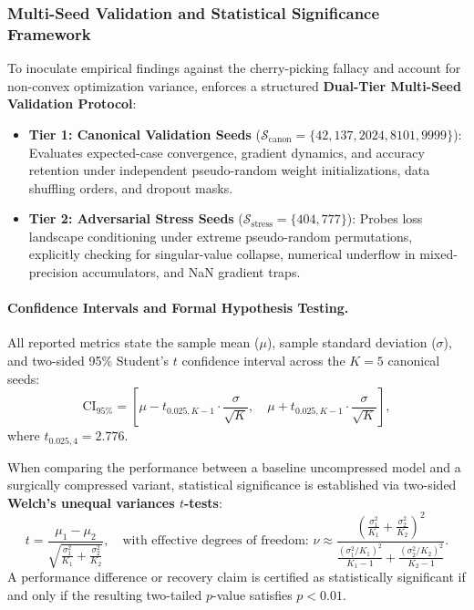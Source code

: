 \subsubsection{Multi-Seed Validation and Statistical Significance Framework}
To inoculate empirical findings against the cherry-picking fallacy and account for non-convex optimization variance, \neuralops{} enforces a structured \textbf{Dual-Tier Multi-Seed Validation Protocol}:
\begin{itemize}
    \item \textbf{Tier 1: Canonical Validation Seeds} ($\mathcal{S}_{\text{canon}} = \{42, 137, 2024, 8101, 9999\}$): Evaluates expected-case convergence, gradient dynamics, and accuracy retention under independent pseudo-random weight initializations, data shuffling orders, and dropout masks.
    \item \textbf{Tier 2: Adversarial Stress Seeds} ($\mathcal{S}_{\text{stress}} = \{404, 777\}$): Probes loss landscape conditioning under extreme pseudo-random permutations, explicitly checking for singular-value collapse, numerical underflow in mixed-precision accumulators, and NaN gradient traps.
\end{itemize}

\paragraph{Confidence Intervals and Formal Hypothesis Testing.}
All reported metrics state the sample mean ($\mu$), sample standard deviation ($\sigma$), and two-sided 95\% Student's $t$ confidence interval across the $K=5$ canonical seeds:
\begin{equation}
\label{eq:confidence_interval}
\text{CI}_{95\%} = \left[ \mu - t_{0.025, K-1} \cdot \frac{\sigma}{\sqrt{K}}, \quad \mu + t_{0.025, K-1} \cdot \frac{\sigma}{\sqrt{K}} \right],
\end{equation}
where $t_{0.025, 4} = 2.776$.

When comparing the performance between a baseline uncompressed model and a surgically compressed variant, statistical significance is established via two-sided \textbf{Welch's unequal variances $t$-tests}:
\begin{equation}
\label{eq:welch_t_test}
t = \frac{\mu_1 - \mu_2}{\sqrt{\frac{\sigma_1^2}{K_1} + \frac{\sigma_2^2}{K_2}}}, \quad \text{with effective degrees of freedom: } \nu \approx \frac{\left( \frac{\sigma_1^2}{K_1} + \frac{\sigma_2^2}{K_2} \right)^2}{\frac{(\sigma_1^2 / K_1)^2}{K_1 - 1} + \frac{(\sigma_2^2 / K_2)^2}{K_2 - 1}}.
\end{equation}
A performance difference or recovery claim is certified as statistically significant if and only if the resulting two-tailed $p$-value satisfies $p < 0.01$.

